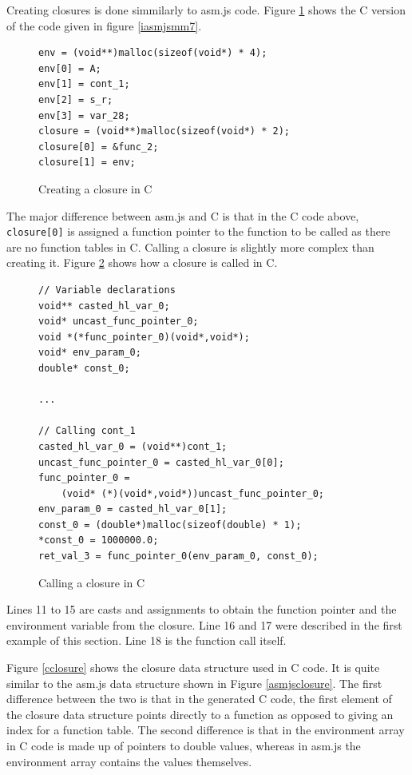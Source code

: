 \documentclass[11pt]{report}
\begin{document}
Creating closures is done simmilarly to asm.js code. Figure \ref{icmm2} shows the C version of the code given in figure \ref{iasmjsmm7}.

\begin{figure}[ht]
\begin{lstlisting}
env = (void**)malloc(sizeof(void*) * 4);
env[0] = A;
env[1] = cont_1;
env[2] = s_r;
env[3] = var_28;
closure = (void**)malloc(sizeof(void*) * 2);
closure[0] = &func_2;
closure[1] = env;
\end{lstlisting}
\caption{Creating a closure in C}
\label{icmm2}
\end{figure}

The major difference between asm.js and C is that in the C code above, \texttt{closure[0]} is assigned a function pointer to the function to be called as there are no function tables in C. Calling a closure is slightly more complex than creating it. Figure \ref{icmm3} shows how a closure is called in C.

\begin{figure}[ht]
\begin{lstlisting}
// Variable declarations
void** casted_hl_var_0;
void* uncast_func_pointer_0;
void *(*func_pointer_0)(void*,void*);
void* env_param_0;
double* const_0;

...

// Calling cont_1
casted_hl_var_0 = (void**)cont_1;
uncast_func_pointer_0 = casted_hl_var_0[0];
func_pointer_0 = 
    (void* (*)(void*,void*))uncast_func_pointer_0;
env_param_0 = casted_hl_var_0[1];
const_0 = (double*)malloc(sizeof(double) * 1);
*const_0 = 1000000.0;
ret_val_3 = func_pointer_0(env_param_0, const_0);
\end{lstlisting}
\caption{Calling a closure in C}
\label{icmm3}
\end{figure}

Lines 11 to 15 are casts and assignments to obtain the function pointer and the environment variable from the closure. Line 16 and 17 were described in the first example of this section. Line 18 is the function call itself.

Figure \ref{cclosure} shows the closure data structure used in C code. It is quite similar to the asm.js data structure shown in Figure \ref{asmjsclosure}. The first difference between the two is that in the generated C code, the first element of the closure data structure points directly to a function as opposed to giving an index for a function table. The second difference is that in the environment array in C code is made up of pointers to double values, whereas in asm.js the environment array contains the values themselves.
\end{document}
